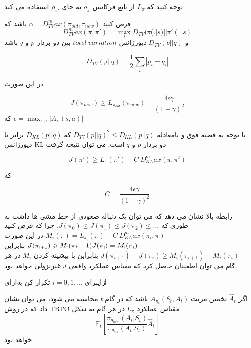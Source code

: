 توجه کنید که $L_\pi$ از تابع فرکانس $\rho_\pi$ به جای $
\rho_{\pi'}$
 استفاده می کند.
 
فرض کنید 
$\alpha = D_{TV}^max(\pi_{old}, \pi_{new})$
باشد که 
$$D_{TV}^max (\pi, \pi') = \max_{s} D_{TV}(\pi(.|s) || \pi'(.|s)$$
و 
$D_{TV}(p || q)$
دیورژانس $total \ variation$ بین دو بردار $p$ و $q$ باشد

$$D_{TV}(p || q) = \dfrac{1}{2} \sum_{i} |p_i - q_i|$$

در این صورت

$$J(\pi_{new}) \ge L_{\pi_{old}}(\pi_{new}) - \dfrac{4 \epsilon \gamma}{(1- \gamma)^2}$$
که 
$\epsilon = \max_{s,a} |A_\pi(s,a)|$

با توجه به قضیه فوق و نامعادله 
$D_{TV}(p || q)^2 \le D_{KL}(p || q)$
\cite{schulman2015trust}
که 
$D_{KL} (p || q)$
برابر با دیورژانس KL دو بردار $p$ و $q$ است. می توان  نتیجه گرفت

$$J(\pi') \ge L_{\pi}(\pi') - C \ D_{KL}^max(\pi, \pi')$$

که

$$C = \dfrac{4 \epsilon \gamma}{(1-\gamma)^2}$$

رابطه بالا نشان می دهد که می توان یک دنباله صعودی از خط مشی ها داشت به طوری که
$J(\pi_0) \le J(\pi_1) \le J(\pi_2) \le ...$.
چرا که فرض کنید 
$M_i(\pi) = L_{\pi_i}(\pi) - C \ D_{KL}^max(\pi_i, \pi)$
در این صورت
$J(\pi_{i+1}) \ge M_i(\pi{i+1}) \\
J(\pi_i) = M_i(\pi_i)
$
بنابراین
$J(\pi_{i+1}) - J(\pi_i) \ge M_i(\pi_{i+1}) - M_i(\pi_i)$
بنابراین با بیشینه کردن $M_i$ در هر گام می توان اطمینان حاصل کرد که مقیاس عملکرد واقعی $J$ غیرنزولی خواهد بود.


‌ازای{برای 
	$i=0,1,...$
	 تکرار کن}
‌به‌ازای

اگر $\hat{A}_t$ تخمین مزیت 
$A_{\pi_t}(S_t, A_t)$
باشد که در گام $t$ محاسبه می شود، می توان نشان داد که در روش TRPO مقیاس عملکرد $L_\pi$ در هر گام به شکل
$$\mathbb{E}_t\left[\dfrac{\pi_{\theta_{new}}(A_t| S_t)}{\pi_{\theta_{old}}(A_t|S_t)} \hat{A}_t \right]$$
خواهد بود.

